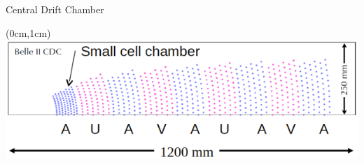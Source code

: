 \documentclass[8pt]{beamer}
\begin{document}
\begin{frame}{Central Drift Chamber}
\begin{textblock*}{10cm}
	\end{textblock*}


\begin{textblock*}{10cm}(0cm,1cm)
	\includegraphics[width=\textwidth]{VBilder/cdc}
\end{textblock*}


\end{frame}
\end{document}
